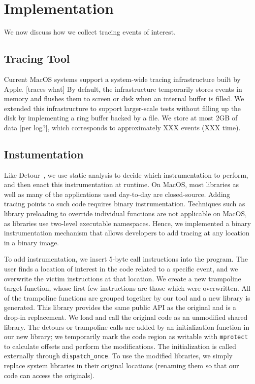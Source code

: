 \section{Implementation}
We now discuss how we collect tracing events of interest.

\subsection{Tracing Tool}
Current MacOS systems support a system-wide tracing infrastructure built by Apple. [traces what]
By default, the infrastructure temporarily stores events in memory and flushes them to screen or disk when an internal buffer is filled.
We extended this infrastructure to support larger-scale tests without filling up the disk by implementing a ring buffer backed by a file.
We store at most 2GB of data [per log?], which corresponds to approximately XXX events (XXX time).


\subsection{Instumentation}
Like Detour~\cite{detourXXXXXXXX}, we use static analysis to decide which instrumentation to perform, and then enact this instrumentation at runtime. 
On MacOS, most libraries as well as many of the applications used day-to-day are closed-source.
Adding tracing points to such code requires binary instrumentation.
Techniques such as library preloading to override individual functions are not applicable on MacOS, as libraries use two-level executable namespaces.
Hence, we implemented a binary instrumentation mechanism that allows developers to add tracing at any location in a binary image.

To add instrumentation, we insert 5-byte call instructions into the program. The user finds a location of interest in the code related to a specific event,
and we overwrite the victim instructions at that location. We create a new trampoline target function, whose first few instructions are those which were overwritten.
All of the trampoline functions are grouped together by our tool and a new library is generated.
This library provides the same public API as the original and is a drop-in replacement. We load and call the original code as an unmodified shared library.
The detours or trampoline calls are added by an initialization function in our new library; we temporarily mark the code region as writable with \texttt{mprotect}
to calculate offsets and perform the modifications. The initialization is called externally through \texttt{dispatch\_once}.
To use the modified libraries, we simply replace system libraries in their original locations (renaming them so that our code can access the originals).

